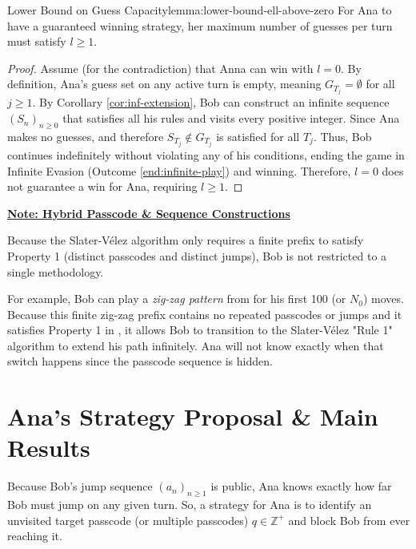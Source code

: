 \begin{lemma}{Lower Bound on Guess Capacity}{lemma:lower-bound-ell-above-zero} \label{lemma:lower-bound-ell-above-zero}
For Ana to have a guaranteed winning strategy, her maximum number of guesses per turn must satisfy $l \ge 1$.
\end{lemma}

\begin{proof}
Assume (for the contradiction) that Anna can win with $l = 0$. By definition, Ana's guess set on any active turn is empty, meaning $G_{T_j} = \emptyset$ for all $j \ge 1$. By Corollary \ref{cor:inf-extension}, Bob can construct an infinite sequence $(S_n)_{n \ge 0}$ that satisfies all his rules and visits every positive integer. Since Ana makes no guesses, and therefore $S_{T_j} \notin G_{T_j}$ is satisfied for all $T_j$. Thus, Bob continues indefinitely without violating any of his conditions, ending the game in Infinite Evasion (Outcome \ref{end:infinite-play}) and winning. Therefore, $l = 0$ does not guarantee a win for Ana, requiring $l \ge 1$.
\end{proof}

\noindent
\ul{\textbf{Note: Hybrid Passcode \& Sequence Constructions}}

\noindent
Because the Slater-Vélez algorithm only requires a finite prefix to satisfy Property 1 (distinct passcodes and distinct jumps), Bob is not restricted to a single methodology.

For example, Bob can play a \textit{zig-zag pattern} from \cite{rosa1967valuations} for his first 100 (or $N_0$) moves. Because this finite zig-zag prefix contains no repeated passcodes or jumps and it satisfies Property 1 in \cite{slater1977permutations}, it allows Bob to transition to the Slater-Vélez "Rule 1" algorithm to extend his path infinitely. Ana will not know exactly when that switch happens since the passcode sequence is hidden. 


\section{Ana's Strategy Proposal \& Main Results}

Because Bob's jump sequence $(a_n)_{n \ge 1}$ is public, Ana knows exactly how far Bob must jump on any given turn. So, a strategy for Ana is to identify an unvisited target passcode (or multiple passcodes) \(q \in \mathbb{Z^+}\) and block Bob from ever reaching it. 

